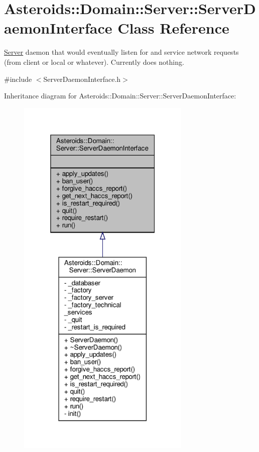 \hypertarget{classAsteroids_1_1Domain_1_1Server_1_1ServerDaemonInterface}{}\section{Asteroids\+:\+:Domain\+:\+:Server\+:\+:Server\+Daemon\+Interface Class Reference}
\label{classAsteroids_1_1Domain_1_1Server_1_1ServerDaemonInterface}


\hyperlink{namespaceAsteroids_1_1Domain_1_1Server}{Server} daemon that would eventually listen for and service network requests (from client or local or whatever). Currently does nothing.  




{\ttfamily \#include $<$Server\+Daemon\+Interface.\+h$>$}



Inheritance diagram for Asteroids\+:\+:Domain\+:\+:Server\+:\+:Server\+Daemon\+Interface\+:\nopagebreak
\begin{figure}[H]
\begin{center}
\leavevmode
\includegraphics[width=235pt]{classAsteroids_1_1Domain_1_1Server_1_1ServerDaemonInterface__inherit__graph}
\end{center}
\end{figure}



